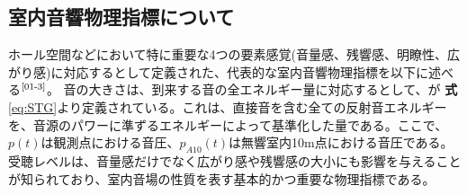 

\subsection{室内音響物理指標について}
ホール空間などにおいて特に重要な4つの要素感覚(音量感、残響感、明瞭性、広がり感)に対応するとして定義された、代表的な室内音響物理指標を以下に述べる$^{\text{\cite{01-3}}}$。
音の大きさは、到来する音の全エネルギー量に対応するとして、\STG が \textbf{式}\ref{eq:STG}より定義されている。これは、直接音を含む全ての反射音エネルギーを、音源のパワーに準ずるエネルギーによって基準化した量である。ここで、$p(t)$は観測点における音圧、$p_{A10}(t)$は無響室内10m点における音圧である。受聴レベルは、音量感だけでなく広がり感や残響感の大小にも影響を与えることが知られており、室内音場の性質を表す基本的かつ重要な物理指標である。

